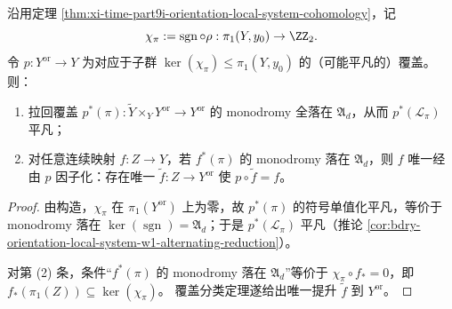 \begin{theorem}[最小定向化二重基变与普适因子化]\label{thm:xi-time-part9i-minimal-orientation-double-cover}
沿用定理 \ref{thm:xi-time-part9i-orientation-local-system-cohomology}，记
\[
\chi_\pi:=\operatorname{sgn}\circ\rho:\pi_1(Y,y_0)\to\ZZ_2.
\]
令 \(p:Y^{\mathrm{or}}\to Y\) 为对应于子群 \(\ker(\chi_\pi)\le \pi_1(Y,y_0)\) 的（可能平凡的）覆盖。
则：
\begin{enumerate}
  \item 拉回覆盖 \(p^\ast(\pi):\widetilde Y\times_Y Y^{\mathrm{or}}\to Y^{\mathrm{or}}\) 的 monodromy 全落在 \(\mathfrak A_d\)，从而 \(p^\ast(\mathcal L_\pi)\) 平凡；
  \item 对任意连续映射 \(f:Z\to Y\)，若 \(f^\ast(\pi)\) 的 monodromy 落在 \(\mathfrak A_d\)，则 \(f\) 唯一经由 \(p\) 因子化：存在唯一 \(\widetilde f:Z\to Y^{\mathrm{or}}\) 使 \(p\circ\widetilde f=f\)。
\end{enumerate}
\end{theorem}
\begin{proof}
由构造，\(\chi_\pi\) 在 \(\pi_1(Y^{\mathrm{or}})\) 上为零，故 \(p^\ast(\pi)\) 的符号单值化平凡，等价于 monodromy 落在 \(\ker(\operatorname{sgn})=\mathfrak A_d\)；于是 \(p^\ast(\mathcal L_\pi)\) 平凡（推论 \ref{cor:bdry-orientation-local-system-w1-alternating-reduction}）。

对第 (2) 条，条件“\(f^\ast(\pi)\) 的 monodromy 落在 \(\mathfrak A_d\)”等价于
\(
\chi_\pi\circ f_\ast=0
\)，即
\(
f_\ast(\pi_1(Z))\subseteq \ker(\chi_\pi)
\)。
覆盖分类定理遂给出唯一提升 \(\widetilde f\) 到 \(Y^{\mathrm{or}}\)。
\end{proof}

